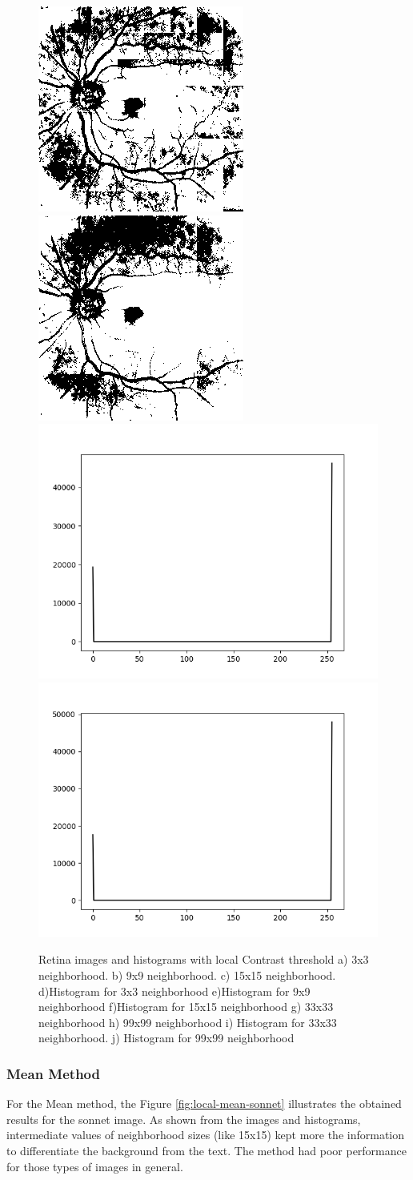 \documentclass[]{IEEEtran}
\begin{document}
\begin{figure}[h]
  \includegraphics[width=0.3\hsize]{images/33x33-window/retina_contrast.png}
  \includegraphics[width=0.3\hsize]{images/99x99-window/retina_contrast.png}
  \includegraphics[width=0.4\hsize]{images/33x33-window/retina_contrast_histogram.png}
  \includegraphics[width=0.4\hsize]{images/99x99-window/retina_contrast_histogram.png}
  \caption{Retina images and histograms with local Contrast threshold a) 3x3 neighborhood. b) 9x9 neighborhood. c) 15x15 neighborhood. d)Histogram for 3x3 neighborhood e)Histogram for 9x9 neighborhood f)Histogram for 15x15 neighborhood g) 33x33 neighborhood h) 99x99 neighborhood i) Histogram for 33x33 neighborhood. j) Histogram for 99x99 neighborhood}
  \label{fig:local-contrast-retina}
\end{figure}

\subsubsection{Mean Method}
For the Mean method, the Figure \ref{fig:local-mean-sonnet} illustrates the obtained results for the sonnet image. As shown from the images and histograms, intermediate values of neighborhood sizes (like 15x15) kept more the information to differentiate the background from the text. The method had poor performance for those types of images in general. 
\end{document}
